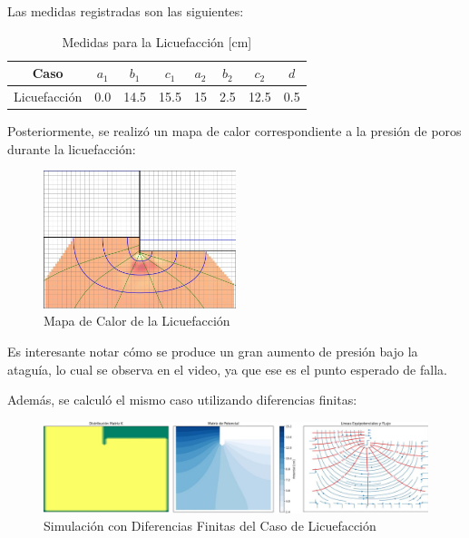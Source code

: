 Las medidas registradas son las siguientes:

\begin{table}[H]
    \centering
    \begin{tabular}{|c|c|c|c|c|c|c|c|}
    \hline
    Caso & $a_1$ & $b_1$ & $c_1$ & $a_2$ & $b_2$ & $c_2$ & $d$ \\ \hline
    Licuefacción & 0.0 & 14.5 & 15.5 & 15 & 2.5 & 12.5 & 0.5 \\ \hline
    \end{tabular}
    \caption{Medidas para la Licuefacción [cm]}
    \label{tab:medidas1}
\end{table}

Posteriormente, se realizó un mapa de calor correspondiente a la presión de poros durante la licuefacción:

\begin{figure}[H]
    \centering
    \includegraphics[width=0.5\textwidth]{GRAFICOS/caso_licuefaccion_presion_poros.jpg}
    \caption{Mapa de Calor de la Licuefacción}
    \label{fig:maqueta_licuefaccion}
\end{figure}

Es interesante notar cómo se produce un gran aumento de presión bajo la ataguía, lo cual se observa en el video, ya que ese es el punto esperado de falla.

Además, se calculó el mismo caso utilizando diferencias finitas:

\begin{figure}[H]
    \centering
    \includegraphics[width=1\textwidth]{GRAFICOS/laplace_caso_licuefaccion_escala_cm.jpg}
    \caption{Simulación con Diferencias Finitas del Caso de Licuefacción}
    \label{fig:maqueta_licuefaccion_diferencias_finitas}
\end{figure}

